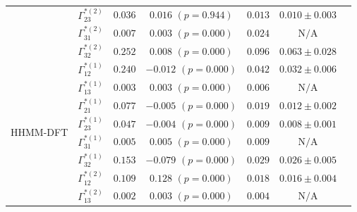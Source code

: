 \documentclass{article}
\begin{document}
\begin{center}
{\begin{tabular}{ccccccc}
                             & $\Gamma^{*(2)}_{23}$          & $0.036$                         & $0.016$ $(p=0.944)$        & $0.013$                           & $0.010 \pm 0.003$                             \\
                             & $\Gamma^{*(2)}_{31}$          & $0.007$                         & $0.003$ $(p=0.000)$        & $0.024$                           & $\text{N/A}$                             \\
                             & $\Gamma^{*(2)}_{32}$          & $0.252$                         & $0.008$ $(p=0.000)$        & $0.096$                           & $0.063 \pm 0.028$                             \\ \hline
\multirow{12}{*}{HHMM-DFT}   & $\Gamma^{*(1)}_{12}$          & $0.240$                         & $-0.012$ $(p=0.000)$        & $0.042$                           & $0.032 \pm 0.006$                             \\
                             & $\Gamma^{*(1)}_{13}$          & $0.003$                         & $0.003$ $(p=0.000)$        & $0.006$                           & $\text{N/A}$                             \\
                             & $\Gamma^{*(1)}_{21}$          & $0.077$                         & $-0.005$ $(p=0.000)$        & $0.019$                           & $0.012 \pm 0.002$                             \\
                             & $\Gamma^{*(1)}_{23}$          & $0.047$                         & $-0.004$ $(p=0.000)$        & $0.009$                           & $0.008 \pm 0.001$                             \\
                             & $\Gamma^{*(1)}_{31}$          & $0.005$                         & $0.005$ $(p=0.000)$        & $0.009$                           & $\text{N/A}$                             \\
                             & $\Gamma^{*(1)}_{32}$          & $0.153$                         & $-0.079$ $(p=0.000)$        & $0.029$                           & $0.026 \pm 0.005$                             \\
                             & $\Gamma^{*(2)}_{12}$          & $0.109$                         & $0.128$ $(p=0.000)$        & $0.018$                           & $0.016 \pm 0.004$                             \\
                             & $\Gamma^{*(2)}_{13}$          & $0.002$                         & $0.003$ $(p=0.000)$        & $0.004$                           & $\text{N/A}$                             \\

\end{tabular}}
\end{center}
\end{document}
